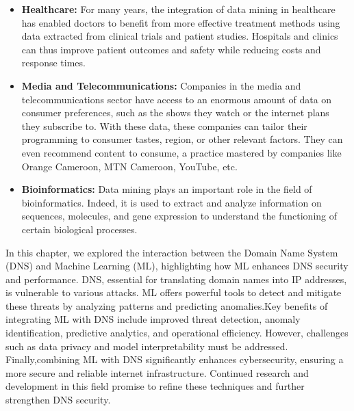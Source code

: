 \begin{itemize}
	\item \textbf{Healthcare:} For many years, the integration of data mining in healthcare has enabled doctors to benefit from more effective treatment methods using data extracted from clinical trials and patient studies. Hospitals and clinics can thus improve patient outcomes and safety while reducing costs and response times.
	
	\item \textbf{Media and Telecommunications:} Companies in the media and telecommunications sector have access to an enormous amount of data on consumer preferences, such as the shows they watch or the internet plans they subscribe to. With these data, these companies can tailor their programming to consumer tastes, region, or other relevant factors. They can even recommend content to consume, a practice mastered by companies like Orange Cameroon, MTN Cameroon, YouTube, etc.
	
	\item \textbf{Bioinformatics:} Data mining plays an important role in the field of bioinformatics. Indeed, it is used to extract and analyze information on sequences, molecules, and gene expression to understand the functioning of certain biological processes.
\end{itemize}
In this chapter, we explored the interaction between the Domain Name System (DNS) and Machine Learning (ML), highlighting how ML enhances DNS security and performance. DNS, essential for translating domain names into IP addresses, is vulnerable to various attacks. ML offers powerful tools to detect and mitigate these threats by analyzing patterns and predicting anomalies.Key benefits of integrating ML with DNS include improved threat detection, anomaly identification, predictive analytics, and operational efficiency. However, challenges such as data privacy and model interpretability must be addressed. Finally,combining ML with DNS significantly enhances cybersecurity, ensuring a more secure and reliable internet infrastructure. Continued research and development in this field promise to refine these techniques and further strengthen DNS security.













































